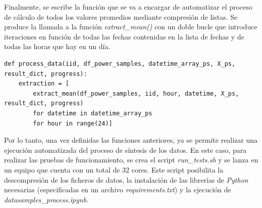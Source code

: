 \vspace{3mm}

Finalmente, se escribe la función que se va a encargar de automatizar el proceso de cálculo de todos los valores promedios mediante compresión de listas. Se produce la llamada a la función \textit{extract\_mean()} con un doble bucle que introduce iteraciones en función de todas las fechas contenidas en la lista de fechas y de todas las horas que hay en un día.

\vspace{3mm}

\begin{lstlisting}[style=Python, caption={Función de automatización del cálculo del promedio}]
  def process_data(iid, df_power_samples, datetime_array_ps, X_ps, result_dict, progress):
    extraction = [
        extract_mean(df_power_samples, iid, hour, datetime, X_ps, result_dict, progress)
        for datetime in datetime_array_ps
        for hour in range(24)]
\end{lstlisting}

\vspace{3mm}

Por lo tanto, una vez definidas las funciones anteriores, ya se permite realizar una ejecución automatizada del proceso de síntesis de los datos. En este caso, para realizar las pruebas de funcionamiento, se crea el script \textit{run\_tests.sh} y se lanza en un equipo que cuenta con un total de 32 cores. Este script posibilita la descompresión de los ficheros de datos, la instalación de las librerías de \textit{Python} necesarias (especificadas en un archivo \textit{requirements.txt}) y la ejecución de \textit{datasamples\_process.ipynb}.

\vspace{3mm}


  
  
  
